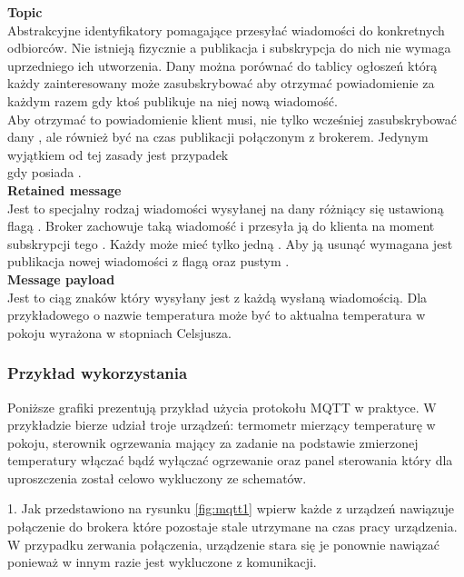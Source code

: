 \hypertarget{topic}{}
\textbf{Topic}\\
Abstrakcyjne identyfikatory pomagające przesyłać wiadomości do konkretnych odbiorców. Nie istnieją fizycznie a publikacja i subskrypcja do nich nie wymaga uprzedniego ich utworzenia. Dany  można porównać do tablicy ogłoszeń którą każdy zainteresowany może zasubskrybować aby otrzymać powiadomienie za każdym razem gdy ktoś publikuje na niej nową wiadomość.\\

Aby otrzymać to powiadomienie klient musi, nie tylko wcześniej zasubskrybować dany , ale również być na czas publikacji połączonym z brokerem. Jedynym wyjątkiem od tej zasady jest przypadek\\gdy {} posiada .\\

\hypertarget{retained message}{}
\textbf{Retained message}\\
Jest to specjalny rodzaj wiadomości wysyłanej na dany  różniący się ustawioną flagą . Broker zachowuje taką wiadomość i przesyła ją do klienta na moment subskrypcji tego . Każdy  może mieć tylko jedną . Aby ją usunąć wymagana jest publikacja nowej wiadomości z flagą  oraz pustym .\\

\hypertarget{message payload}{}
\textbf{Message payload}\\
Jest to ciąg znaków który wysyłany jest z każdą wysłaną wiadomością. Dla przykładowego  o nazwie temperatura może być to aktualna temperatura w pokoju wyrażona w stopniach Celsjusza.

\newpage

\subsubsection{Przykład wykorzystania}
Poniższe grafiki prezentują przykład użycia protokołu MQTT w praktyce. W przykładzie bierze udział troje urządzeń: termometr mierzący temperaturę w pokoju, sterownik ogrzewania mający za zadanie na podstawie zmierzonej temperatury włączać bądź wyłączać ogrzewanie oraz panel sterowania który dla uproszczenia został celowo wykluczony ze schematów.\\

\vspace{2em}

1. Jak przedstawiono na rysunku \ref{fig:mqtt1} wpierw każde z urządzeń nawiązuje połączenie do brokera które pozostaje stale utrzymane na czas pracy urządzenia. W przypadku zerwania połączenia, urządzenie stara się je ponownie nawiązać ponieważ w innym razie jest wykluczone z komunikacji.\\

